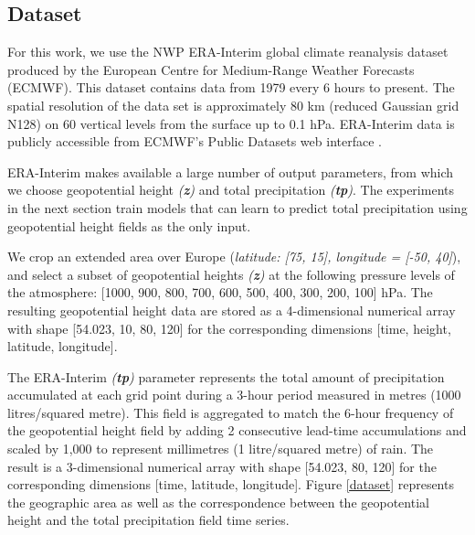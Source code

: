 \documentclass[twocol]{ametsoc}
\begin{document}
\subsection{Dataset}

For this work, we use the NWP ERA-Interim \citep{dee2011era} global climate reanalysis dataset produced by the European Centre for Medium-Range Weather Forecasts (ECMWF). This dataset contains data from 1979 every 6 hours to present. The spatial resolution of the data set is approximately 80 km (reduced Gaussian grid N128) on 60 vertical levels from the surface up to 0.1 hPa. ERA-Interim data is publicly accessible from ECMWF's Public Datasets web interface \citep{1321008426928}.

ERA-Interim makes available a large number of output parameters, from which we choose geopotential height \textit{(\textbf{z})} and total precipitation \textit{(\textbf{tp})}. The experiments in the next section train models that can learn to predict total precipitation using geopotential height fields as the only input.

We crop an extended area over Europe (\textit{latitude: [75, 15], longitude = [-50, 40]}), and select a subset of geopotential heights \textit{(\textbf{z})} at the following pressure levels of the atmosphere: [1000, 900, 800, 700, 600, 500, 400, 300, 200, 100] hPa. The resulting geopotential height data are stored as a 4-dimensional numerical array with shape [54.023, 10, 80, 120] for the corresponding dimensions [time, height, latitude, longitude]. 

The ERA-Interim \textit{(\textbf{tp})} parameter represents the total amount of precipitation accumulated at each grid point during a 3-hour period measured in metres (1000 litres/squared metre). This field is aggregated to match the 6-hour frequency of the geopotential height field by adding 2 consecutive lead-time accumulations and scaled by 1,000 to represent millimetres (1 litre/squared metre) of rain. The result is a 3-dimensional numerical array with shape [54.023, 80, 120] for the corresponding dimensions [time, latitude, longitude]. Figure \ref{dataset} represents the geographic area as well as the correspondence between the geopotential height and the total precipitation field time series. 
\end{document}
